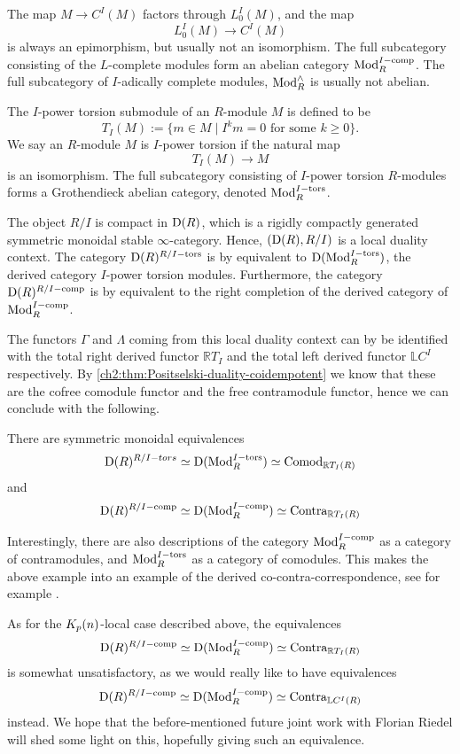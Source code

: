 The map $M\to C^I(M)$ factors through $L_0^I(M)$, and the map 
\[L_0^I(M)\to C^I(M)\] 
is always an epimorphism, but usually not an isomorphism. The full subcategory consisting of the $L$-complete modules form an abelian category $\mathrm{Mod}_R^{I-\mathrm{comp}}$. The full subcategory of $I$-adically complete modules, $\mathrm{Mod}_R^\wedge$ is usually not abelian. 

The $I$-power torsion submodule of an $R$-module $M$ is defined to be 
\[T_I(M) := \{m \in M \mid I^k m = 0 \text{ for some } k\geq 0\}.\]
We say an $R$-module $M$ is $I$-power torsion if the natural map 
\[T_I(M) \to M\] 
is an isomorphism. The full subcategory consisting of $I$-power torsion $R$-modules forms a Grothendieck abelian category, denoted $\mathrm{Mod}_R^{I-\mathrm{tors}}$. 

The object $R/I$ is compact in $\mathrm{D}(R)$, which is a rigidly compactly generated symmetric monoidal stable $\infty$-category. Hence, $(\mathrm{D}(R), R/I)$ is a local duality context. The category $\mathrm{D}(R)^{R/I-\mathrm{tors}}$ is by \cite[3.7(2)]{barthel-heard-valenzuela_2020} equivalent to $\mathrm{D}(\mathrm{Mod}_R^{I-\mathrm{tors}})$, the derived category $I$-power torsion modules. Furthermore, the category $\mathrm{D}(R)^{R/I-\mathrm{comp}}$ is by \cite[3.7(1)]{barthel-heard-valenzuela_2020} equivalent to the right completion of the derived category of $\mathrm{Mod}_R^{I-\mathrm{comp}}$. 

The functors $\Gamma$ and $\Lambda$ coming from this local duality context can by \cite[3.16]{barthel-heard-valenzuela_2018} be identified with the total right derived functor $\mathbb{R}T_I$ and the total left derived functor $\mathbb{L}C^I$ respectively. By \cref{ch2:thm:Positselski-duality-coidempotent} we know that these are the cofree comodule functor and the free contramodule functor, hence we can conclude with the following. 

\begin{proposition}
    There are symmetric monoidal equivalences
    \[\mathrm{D}(R)^{R/I-tors}\simeq \mathrm{D}(\mathrm{Mod}_R^{I-\mathrm{tors}})\simeq \mathrm{Comod}_{\mathbb{R}T_I(R)}\]
    and 
    \[\mathrm{D}(R)^{R/I-\mathrm{comp}}\simeq \mathrm{D}(\mathrm{Mod}_R^{I-\mathrm{comp}})\simeq \mathrm{Contra}_{\mathbb{R}T_I(R)}\]
\end{proposition}

Interestingly, there are also descriptions of the category $\mathrm{Mod}_R^{I-\mathrm{comp}}$ as a category of contramodules, and $\mathrm{Mod}_R^{I-\mathrm{tors}}$ as a category of comodules. This makes the above example into an example of the derived co-contra-correspondence, see for example \cite{positselski_2016}. 

As for the ${K_p(n)}$-local case described above, the equivalences
\[\mathrm{D}(R)^{R/I-\mathrm{comp}}\simeq \mathrm{D}(\mathrm{Mod}_R^{I-\mathrm{comp}})\simeq \mathrm{Contra}_{\mathbb{R}T_I(R)}\]
is somewhat unsatisfactory, as we would really like to have equivalences 
\[\mathrm{D}(R)^{R/I-\mathrm{comp}}\simeq \mathrm{D}(\mathrm{Mod}_R^{I-\mathrm{comp}})\simeq \mathrm{Contra}_{\mathbb{L}C^I(R)}\]
instead. We hope that the before-mentioned future joint work with Florian Riedel will shed some light on this, hopefully giving such an equivalence.  